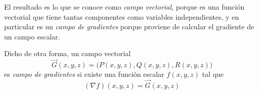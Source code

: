 El resultado es lo que se conoce como \emph{campo vectorial}, porque es una función vectorial que tiene tantas componentes como variables independientes, y en particular es un \emph{campo de gradientes} porque proviene de calcular el gradiente de un campo escalar.

Dicho de otra forma, un campo vectorial
\[ \Vec{G}(x, y, z) = \Big( P(x, y, z), Q(x, y, z), R(x, y, z) \Big) \]
es \emph{campo de gradientes} si existe una función escalar $f(x, y, z)$ tal que
\[ \left(\nabla f\right)\!(x, y, z) = \Vec{G}(x, y, z) \]